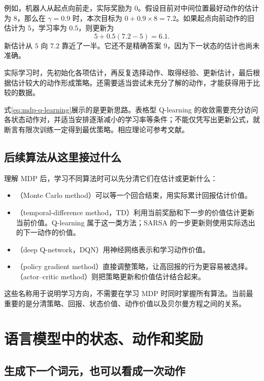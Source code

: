 \documentclass[UTF8]{ctexart}
\begin{document}
例如，机器人从起点向前走，实际奖励为 $0$。假设目前对中间位置最好动作的估计为 $8$，那么在 $\gamma=0.9$ 时，本次目标为 $0+0.9\times8=7.2$。如果起点向前动作的旧估计为 $5$，学习率为 $0.5$，则更新为
\[
  5+0.5(7.2-5)=6.1.
\]
新估计从 $5$ 向 $7.2$ 靠近了一半。它还不是精确答案 $9$，因为下一状态的估计也尚未准确。

实际学习时，先初始化各项估计，再反复选择动作、取得经验、更新估计，最后根据估计较大的动作形成策略。还需要适当尝试未充分了解的动作，才能获得用于比较的数据。

式\eqref{eq:mdp-q-learning}展示的是更新思路。表格型 Q-learning 的收敛需要充分访问各状态动作对，并适当安排逐渐减小的学习率等条件；不能仅凭写出更新公式，就断言有限次训练一定得到最优策略。相应理论可参考文献\cite{watkins-dayan}。

\subsection{后续算法从这里接过什么}

理解 MDP 后，学习不同算法时可以先分清它们在估计或更新什么：
\begin{itemize}
  \item {}（Monte Carlo method）可以等一个回合结束，用实际累计回报估计价值。
  \item {}（temporal-difference method，TD）利用当前奖励和下一步的价值估计更新当前价值。Q-learning 属于这一类方法；SARSA 的一步更新则使用实际选出的下一动作的价值。
  \item {}（deep Q-network，DQN）用神经网络表示和学习动作价值。
  \item {}（policy gradient method）直接调整策略，让高回报的行为更容易被选择。（actor--critic method）则把策略更新和价值估计结合起来。
\end{itemize}

这些名称用于说明学习方向，不需要在学习 MDP 时同时掌握所有算法。当前最重要的是分清策略、回报、状态价值、动作价值以及贝尔曼方程之间的关系。

\section{语言模型中的状态、动作和奖励}
\label{sec:mdp-llm}

\subsection{生成下一个词元，也可以看成一次动作}
\end{document}
